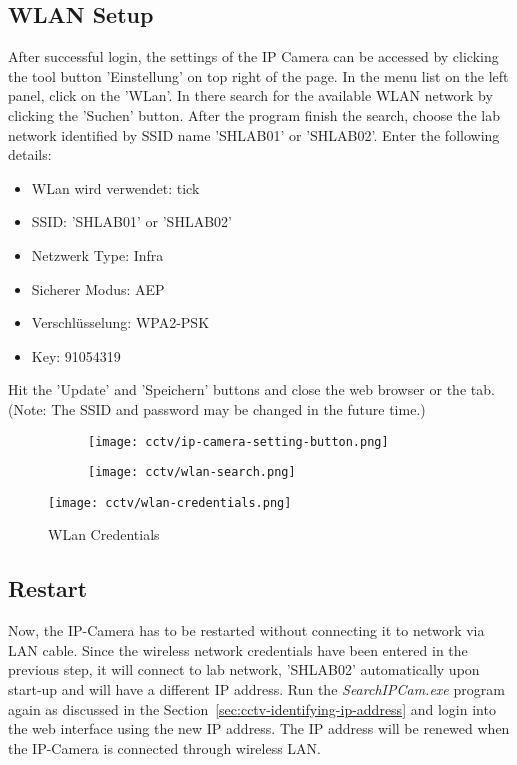 \subsection{WLAN Setup}
After successful login, the settings of the IP Camera can be accessed by clicking the tool button 'Einstellung' on top right of the page. In the menu list on the left panel, click on the 'WLan'. In there search for the available WLAN network by clicking the 'Suchen' button. After the program finish the search, choose the lab network identified by SSID name 'SHLAB01' or 'SHLAB02'. Enter the following details:
\begin{itemize}
\item WLan wird verwendet: tick
\item SSID: 'SHLAB01' or 'SHLAB02'
\item Netzwerk Type: Infra
\item Sicherer Modus: AEP
\item Verschl\"usselung: WPA2-PSK
\item Key: 91054319
\end{itemize}
Hit the 'Update' and 'Speichern' buttons and close the web browser or the tab. (Note: The SSID and password may be changed in the future time.)
\begin{figure}[ht]
\caption{IP-Camera WLAN settings}
\label{ip-camera-wlan-settings}
\centering
	\begin{subfigure}{.34\textwidth}
	\texttt{[image: cctv/ip-camera-setting-button.png]}
	\end{subfigure}
	\begin{subfigure}{.63\textwidth}
	\texttt{[image: cctv/wlan-search.png]}
	\end{subfigure}
\end{figure}
\begin{figure}[ht]
\caption{WLan Credentials}
\label{wlan-credentials}
\centering
\texttt{[image: cctv/wlan-credentials.png]}
\end{figure}

\subsection{Restart}
Now, the IP-Camera has to be restarted without connecting it to network via LAN cable. Since the wireless network credentials have been entered in the previous step, it will connect to lab network, 'SHLAB02' automatically upon start-up and will have a different IP address. Run the \emph{SearchIPCam.exe} program again as discussed in the Section~\ref{sec:cctv-identifying-ip-address} and login into the web interface using the new IP address. The IP address will be renewed when the IP-Camera is connected through wireless LAN.

